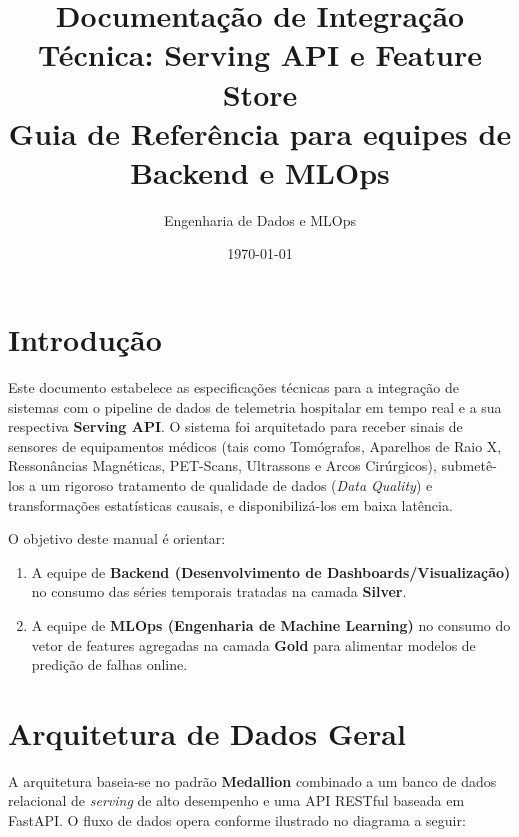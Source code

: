 \documentclass[12pt,a4paper]{article}
\title{Documentação de Integração Técnica: Serving API e Feature Store \\ \large Guia de Referência para equipes de Backend e MLOps}
\author{Engenharia de Dados e MLOps}
\date{\today}
\begin{document}
\maketitle
\tableofcontents
\newpage

\section{Introdução}
Este documento estabelece as especificações técnicas para a integração de sistemas com o pipeline de dados de telemetria hospitalar em tempo real e a sua respectiva \textbf{Serving API}. O sistema foi arquitetado para receber sinais de sensores de equipamentos médicos (tais como Tomógrafos, Aparelhos de Raio X, Ressonâncias Magnéticas, PET-Scans, Ultrassons e Arcos Cirúrgicos), submetê-los a um rigoroso tratamento de qualidade de dados (\textit{Data Quality}) e transformações estatísticas causais, e disponibilizá-los em baixa latência.

O objetivo deste manual é orientar:
\begin{enumerate}
    \item A equipe de \textbf{Backend (Desenvolvimento de Dashboards/Visualização)} no consumo das séries temporais tratadas na camada \textbf{Silver}.
    \item A equipe de \textbf{MLOps (Engenharia de Machine Learning)} no consumo do vetor de features agregadas na camada \textbf{Gold} para alimentar modelos de predição de falhas online.
\end{enumerate}

\section{Arquitetura de Dados Geral}
A arquitetura baseia-se no padrão \textbf{Medallion} combinado a um banco de dados relacional de \textit{serving} de alto desempenho e uma API RESTful baseada em FastAPI. O fluxo de dados opera conforme ilustrado no diagrama a seguir:
\end{document}
